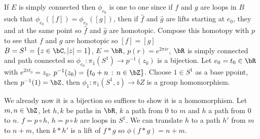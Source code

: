 \noindent
If $E$ is simply connected then $\phi_{e_0}$ is one to one since if $f$ and $g$ are loops in $B$ such that $\phi_{e_0}([f]) = \phi_{e_0}([g])$, then if $\hat{f}$ and $\hat{g}$ are lifts starting at $e_0$, they and at the same point so $\hat{f}$ and $\hat{g}$ are homotopic. Compose this homotopy with $p$ to see that $f$ and $g$ are homotopic so $[f] = [g]$ \\

\noindent
$B = S^1 = \{z \in \bC, |z| = 1\}$, $E = \bR$, $p(r)= e^{2 \pi i r}$, $\bR$ is simply connected and path connected so $\phi_{e_0}: \pi_1(S^1) \to p^{-1}(z_0)$ is a bijection. Let $e_0 = t_0 \in \bR$ with $e^{2 \pi t_0} = z_0$, $p^{-1}(z_0) = \{t_0 + n \, :  \, n \in \bZ\}$. Choose $1 \in S^1$ as a base ppoint, then $p^{-1}(1) = \bZ$,  then $\phi_1: \pi_1(S^1, z) \to bZ$ is a group homomorphism. 

\begin{pf}
    We already now it is a bijection so suffices to show it is a homomorphism. Let $m, n \in \bZ$, let $h,k$ be paths in $\bR$, $k$ a path from $0$ to $m$ and $h$ a path from $0$ to $n$. $f = p \circ h$, $h = p \circ k$ are loops in $S^1$. We can translate $h$ to a path $h'$ from $m$ to $n+m$, then $k*h'$ is a lift of $f*g$ so $\phi(f*g) = n+m$. 
\end{pf}

